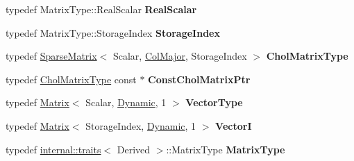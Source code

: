 \begin{DoxyCompactItemize}
\mbox{\label{group___sparse_cholesky___module_a14a24573a05a0653ea8e4c7a6616d544}} 
typedef Matrix\+Type\+::\+Real\+Scalar {\bfseries Real\+Scalar}
\item 
\mbox{\label{group___sparse_cholesky___module_a7d5ace38d212f98e659bfdaf947372cc}} 
typedef Matrix\+Type\+::\+Storage\+Index {\bfseries Storage\+Index}
\item 
\mbox{\label{group___sparse_cholesky___module_addfb5032ff8efea57e3576d96326e822}} 
typedef \hyperlink{group___sparse_core___module_class_eigen_1_1_sparse_matrix}{Sparse\+Matrix}$<$ Scalar, \hyperlink{group__enums_ggaacded1a18ae58b0f554751f6cdf9eb13a0cbd4bdd0abcfc0224c5fcb5e4f6669a}{Col\+Major}, Storage\+Index $>$ {\bfseries Chol\+Matrix\+Type}
\item 
\mbox{\label{group___sparse_cholesky___module_a2980c8f7ae5c6c19c4f2fc428be249e4}} 
typedef \hyperlink{group___sparse_core___module}{Chol\+Matrix\+Type} const  $\ast$ {\bfseries Const\+Chol\+Matrix\+Ptr}
\item 
\mbox{\label{group___sparse_cholesky___module_a9ac3cfb0b045fd84e4fe6bfcd627f582}} 
typedef \hyperlink{group___core___module_class_eigen_1_1_matrix}{Matrix}$<$ Scalar, \hyperlink{namespace_eigen_ad81fa7195215a0ce30017dfac309f0b2}{Dynamic}, 1 $>$ {\bfseries Vector\+Type}
\item 
\mbox{\label{group___sparse_cholesky___module_a60a6f0c73dfa90d8a5b679dd0469374a}} 
typedef \hyperlink{group___core___module_class_eigen_1_1_matrix}{Matrix}$<$ Storage\+Index, \hyperlink{namespace_eigen_ad81fa7195215a0ce30017dfac309f0b2}{Dynamic}, 1 $>$ {\bfseries VectorI}
\item 
\mbox{\label{group___sparse_cholesky___module_ac4d3851843aa1a04ce4849cc6ed27f71}} 
typedef \hyperlink{struct_eigen_1_1internal_1_1traits}{internal\+::traits}$<$ Derived $>$\+::Matrix\+Type {\bfseries Matrix\+Type}
\item 
\mbox{\label{group___sparse_cholesky___module_afb046a5d3d43cd0c7d49e934db5c2091}} 

\end{DoxyCompactItemize}

